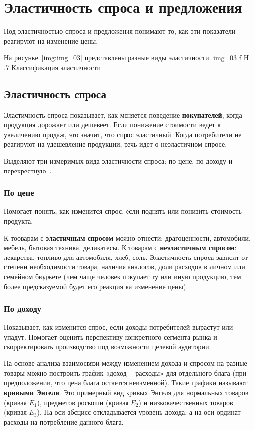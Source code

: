 \chapter{Эластичность спроса и предложения}

Под эластичностью спроса и предложения понимают то, как эти показатели реагируют на изменение цены. 

На рисунке~\ref{img:img_03} представлены разные виды эластичности.
{img_03}
{f}
{H}
{.7\textwidth}
{Классификация эластичности~\cite{elast1}}

\section{Эластичность спроса}

Эластичность спроса показывает, как меняется поведение \textbf{покупателей}, когда продукция дорожает или дешевеет. 
Если понижение стоимости ведет к увеличению продаж, это значит, что спрос эластичный.
Когда потребители не реагируют на удешевление продукции, речь идет о неэластичном спросе.

Выделяют три измеримых вида эластичности спроса: по цене, по доходу и перекрестную~\cite{elast2}.

\subsection{По цене}
Помогает понять, как изменится спрос, если поднять или понизить стоимость продукта. 

К тооварам с \textbf{эластичным спросом} можно отнести: драгоценности, автомобили, мебель, бытовая техника, деликатесы. 
К товарам с \textbf{неэластичным спросом}: лекарства, топливо для автомобиля, хлеб, соль. 
Эластичность спроса зависит от степени необходимости товара, наличия аналогов, доли расходов в личном или семейном бюджете (чем чаще человек покупает ту или иную продукцию, тем более предсказуемой будет его реакция на изменение цены).

\subsection{По доходу}
Показывает, как изменится спрос, если доходы потребителей вырастут или упадут. 
Помогает оценить перспективу конкретного сегмента рынка и скорректировать производство под возможности целевой аудитории.

На основе анализа взаимосвязи между изменением дохода и спросом на разные товары можно построить график «доход~-~расходы» для отдельного блага (при предположении, что цена блага остается неизменной). 
Такие графики называют \textbf{кривыми Энгеля}. 
Это примерный вид кривых Энгеля для нормальных товаров (кривая $E_{1}$), предметов роскоши (кривая $E_{2}$) и низкокачественных товаров (кривая $E_{3}$). 
На оси абсцисс откладывается уровень дохода, а на оси ординат~--- расходы на потребление данного блага. 

